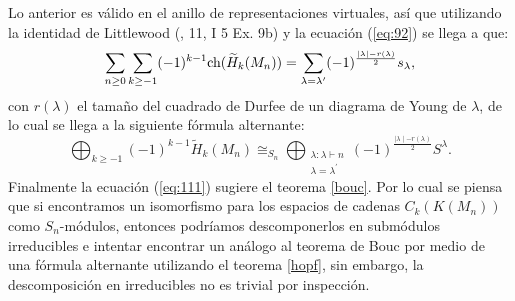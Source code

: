\documentclass[12pt]{book}
\theoremstyle{definition}
\newcounter{in}
\begin{document}
Lo anterior es válido en el anillo de representaciones virtuales, así que utilizando la identidad de Littlewood \normalfont(\cite{macdonald1998symmetric}, 11, I 5 Ex. 9b) y la ecuación (\ref{eq:92}) se llega a
que:
\begin{equation}
  \label{eq:90}
\sum_{n \geq 0} \sum_{k \geq -1}(-1)^{k-1}\textup{ch}(\widetilde{H}_k(M_n)) = \sum_{\lambda = {\lambda}'}(-1)^{\frac{\mid \lambda \mid - r(\lambda)}{2}}s_{\lambda},  
\end{equation}
con $r(\lambda)$ el tamaño del cuadrado de Durfee de un diagrama de
Young de $\lambda$, de lo cual se llega a la siguiente fórmula
alternante:
\begin{equation}
  \label{eq:111}
  \bigoplus_{k \geq -1}(-1)^{k-1}\widetilde{H}_k(M_n) \cong_{S_{n}} \bigoplus_{\substack{\lambda:\lambda\vdash n\\
      \lambda=\lambda^{'}}} (-1)^{\frac{\mid \lambda \mid - r(\lambda)}{2}}S^{\lambda}.
\end{equation}
  Finalmente la ecuación (\ref{eq:111}) sugiere el teorema \ref{bouc}. Por lo
  cual se piensa que si encontramos un isomorfismo para los espacios
  de cadenas $C_k(K(M_n))$ como $S_n$-módulos, entonces podríamos
  descomponerlos en submódulos irreducibles e intentar encontrar un
  análogo al teorema de Bouc por medio de una fórmula alternante
  utilizando el teorema \ref{hopf}, sin embargo, la descomposición en
  irreducibles no es trivial por inspección.
\end{document}
